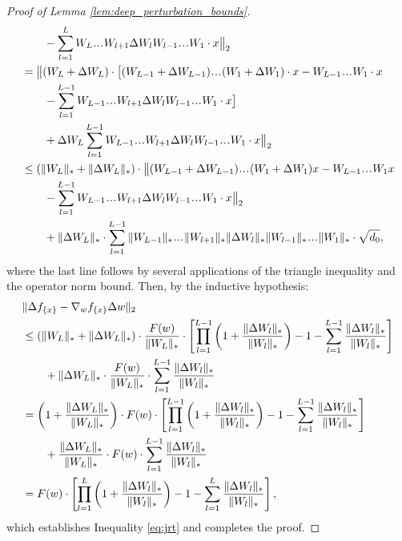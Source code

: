 \begin{refsection}
\begin{proof}[Proof of Lemma \ref{lem:deep_perturbation_bounds}]
\begin{align*}
    &\qquad - \sum_{l=1}^L W_L\mydots W_{l+1} \Delta W_l W_{l-1}\mydots W_1 \cdot x \big\|_2 \\
    & = \big\|(W_L+\Delta W_L)\cdot\big[ (W_{L-1}+\Delta W_{L-1}) \mydots (W_1+\Delta W_1)\cdot x - W_{L-1} \mydots W_1\cdot x \\
    & \qquad - \sum_{l=1}^{L-1} W_{L-1}\mydots W_{l+1} \Delta W_l W_{l-1}\mydots W_1 \cdot x \big] \\ &\qquad +\Delta W_L \sum_{l=1}^{L-1} W_{L-1}\mydots W_{l+1} \Delta W_l W_{l-1}\mydots W_1 \cdot x \big\|_2 \\
    & \leq (\norm{W_L}_*+\norm{\Delta W_L}_*)\cdot\big\|(W_{L-1}+\Delta W_{L-1}) \mydots (W_1+\Delta W_1)x - W_{L-1} \mydots W_1 x \\
    & \qquad - \sum_{l=1}^{L-1} W_{L-1}\mydots W_{l+1} \Delta W_l W_{l-1}\mydots W_1 \cdot x \big\|_2 \\ &\qquad +\norm{\Delta W_L}_* \cdot \sum_{l=1}^{L-1} \norm{W_{L-1}}_*\mydots \norm{W_{l+1}}_* \norm{\Delta W_l}_* \norm{W_{l-1}}_*\mydots \norm{W_1}_* \cdot \sqrt{d_0},
\end{align*}
where the last line follows by several applications of the triangle inequality and the operator norm bound. Then, by the inductive hypothesis:
\begin{align*}
&\Vert {\Delta f_{\{x\}} - \nabla_w f_{\{x\}}\Delta w} \Vert_2\\
& \leq (\Vert {W_L} \Vert_*+\Vert {\Delta W_L} \Vert_*)\cdot
    \frac{F(w)}{\Vert {W_L} \Vert_*} \cdot \left[ \prod_{l=1}^{L-1} \left( 1 + \frac{\Vert \Delta W_l \Vert_{*}}{\Vert W_l \Vert_{*}}\right)  - 1 - \sum_{l=1}^{L-1} \frac{\Vert \Delta W_l \Vert_{*}}{\Vert W_l \Vert_{*}} \right] \\
&\qquad+ \Vert {\Delta W_L} \Vert_* \cdot \frac{F(w)}{\Vert {W_L} \Vert_*} \cdot \sum_{l=1}^{L-1}\frac{\Vert {\Delta W_l} \Vert_*}{\Vert {W_l} \Vert_*} \\
& = \left(1+\frac{\Vert {\Delta W_L} \Vert_*}{\Vert {W_L} \Vert_*}\right)\cdot
    F(w) \cdot \left[ \prod_{l=1}^{L-1} \left( 1 + \frac{\Vert \Delta W_l \Vert_{*}}{\Vert W_l \Vert_{*}}\right)  - 1 - \sum_{l=1}^{L-1} \frac{\Vert \Delta W_l \Vert_{*}}{\Vert W_l \Vert_{*}} \right] \\
&\qquad+ \frac{\Vert {\Delta W_L} \Vert_*}{\Vert {W_L} \Vert_*} \cdot F(w) \cdot \sum_{l=1}^{L-1}\frac{\Vert {\Delta W_l} \Vert_*}{\Vert {W_l} \Vert_*} \\
&= F(w) \cdot \left[ \prod_{l=1}^L \left( 1 + \frac{\Vert \Delta W_l \Vert_{*}}{\Vert W_l \Vert_{*}}\right)  - 1 - \sum_{l=1}^L \frac{\Vert \Delta W_l \Vert_{*}}{\Vert W_l \Vert_{*}} \right],
\end{align*}
which establishes Inequality \ref{eq:jrt} and completes the proof.
\end{proof}


\end{refsection}

